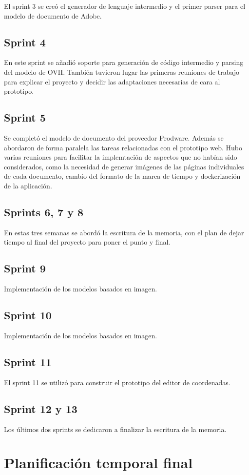 El sprint 3 se creó el generador de lenguaje intermedio y el primer parser para el modelo de documento de Adobe.

\subsection{Sprint 4}

En este sprint se añadió soporte para generación de código intermedio y parsing del modelo de OVH. También tuvieron lugar las primeras reuniones de trabajo para explicar el proyecto y decidir las adaptaciones necesarias de cara al prototipo.

\subsection{Sprint 5}

Se completó el modelo de documento del proveedor Prodware. Además se abordaron de forma paralela las tareas relacionadas con el prototipo web. Hubo varias reuniones para facilitar la implemtación de aspectos que no habían sido considerados, como  la necesidad de generar imágenes de las páginas individuales de cada documento, cambio del formato de la marca de tiempo y dockerización de la aplicación.

\subsection{Sprints 6, 7 y 8}

En estas tres semanas se abordó la escritura de la memoria, con el plan de dejar tiempo al final del proyecto para poner el punto y final.

\subsection{Sprint 9}

Implementación de los modelos basados en imagen.

\subsection{Sprint 10}

Implementación de los modelos basados en imagen.

\subsection{Sprint 11}

El sprint 11 se utilizó para construir el prototipo del editor de coordenadas.

\subsection{Sprint 12 y 13}

Los últimos dos sprints se dedicaron a finalizar la escritura de la memoria.


\section{Planificación temporal final}

